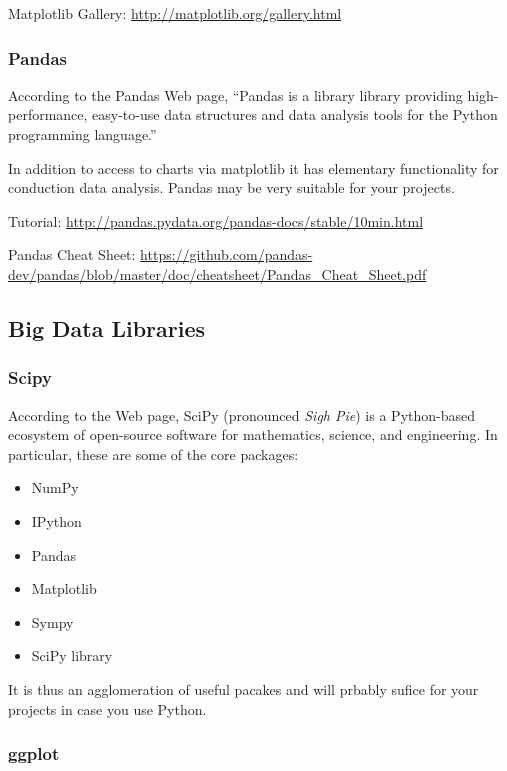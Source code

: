 Matplotlib Gallery: \url{http://matplotlib.org/gallery.html}

\subsubsection{Pandas}\label{pandas}


According to the Pandas Web page, ``Pandas is a library library
providing high-performance, easy-to-use data structures and data
analysis tools for the Python programming language.''

In addition to access to charts via matplotlib it has elementary
functionality for conduction data analysis. Pandas may be very suitable
for your projects.

Tutorial: \url{http://pandas.pydata.org/pandas-docs/stable/10min.html}

Pandas Cheat Sheet:
\url{https://github.com/pandas-dev/pandas/blob/master/doc/cheatsheet/Pandas_Cheat_Sheet.pdf}

\subsection{Big Data Libraries}\label{other-useful-libraries}

\subsubsection{Scipy}\label{scipy}


According to the Web page, SciPy (pronounced \textit{Sigh Pie}) is a
Python-based ecosystem of open-source software for mathematics, science,
and engineering. In particular, these are some of the core packages:

\begin{itemize}
\item NumPy
\item IPython
\item Pandas
\item Matplotlib
\item Sympy
\item SciPy library
\end{itemize}

It is thus an agglomeration of useful pacakes and will prbably sufice
for your projects in case you use Python.

\subsubsection{ggplot}\label{ggplot}

